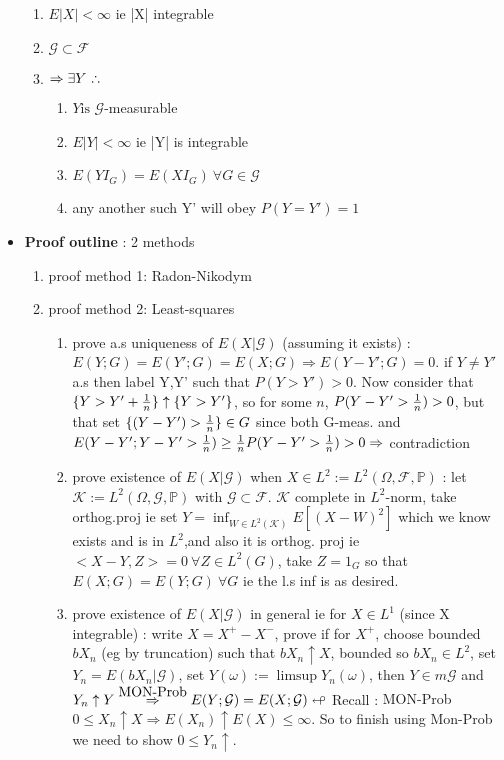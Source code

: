 \documentclass[10pt,landscape,a4paper]{article}
\newcommand\myright[1]{\stackrel{{\normalfont\mbox{#1}}}{ \Rightarrow }}
\begin{document}
\begin{multicols*}{3}
\begin{spacing}{0.5}
\begin{itemize}
\begin{enumerate}
\item $E|X| < \infty$ ie |X| integrable
\item $\mathcal{G} \subset \mathcal{F}$
\item $\Rightarrow \exists Y \sucht$
\begin{enumerate}
\item $Y \text{is } \mathcal{G}$-measurable
\item $E|Y| < \infty$ ie |Y| is integrable
\item $E(YI_G) = E(XI_G)\ \forall G \in \mathcal{G}$
\item any another such Y' will obey $P(Y=Y')=1$
\end{enumerate}
\end{enumerate}
\item \textbf{Proof outline} : 2 methods
\begin{enumerate}
\item proof method 1: Radon-Nikodym
\item proof method 2: Least-squares
\begin{enumerate}
\item prove a.s uniqueness of $E(X|\mathcal{G})$ (assuming it exists) : $E(Y;G)=E(Y';G)=E(X;G) \Rightarrow E(Y-Y';G)=0$. if $Y \neq Y'$ a.s then label Y,Y' such that $P(Y>Y')>0$. Now consider that $\{Y>Y'+ {1 \over n}\} \uparrow \{Y>Y'\}$, so for some $n$, $P(Y-Y'> {1\over n}) >0$, but that set $\{(Y-Y')> {1\over n}\} \in G$ since both G-meas. and $E(Y-Y';Y-Y'>{1 \over n})\ge {1 \over n} P(Y-Y' > {1 \over n}) >0 \Rightarrow$ contradiction

\item prove existence of $E(X|\mathcal{G})$ when $X \in L^2:=L^2(\Omega,\mathcal{F},\mathbb{P})$ : let $\mathcal{K}:=L^2(\Omega,\mathcal{G},\mathbb{P})$ with $\mathcal{G} \subset \mathcal{F}$. $\mathcal{K}$ complete in $L^2$-norm, take orthog.proj ie set $Y=\inf_{W \in L^2(\mathcal{K})} E [ {(X-W)}^2 ] $ which we know exists and is in $L^2$,and also it is orthog. proj ie $<X-Y,Z>=0\ \forall Z \in L^2(G)$, take $Z=1_G$ so that $E(X;G)=E(Y;G)\ \forall G$ ie the  l.s inf is as desired.

\item prove existence of $E(X|\mathcal{G})$ in general ie for $X \in L^1$ (since X integrable) : write $X=X^+-X^-$, prove if for $X^+$, choose bounded $bX_n$ (eg by truncation) such that $bX_n \uparrow X$, bounded so $bX_n \in L^2$, set $Y_n=E(bX_n|\mathcal{G})$, set $Y(\omega) := \limsup Y_n(\omega)$, then $Y \in m\mathcal{G}$ and $Y_n \uparrow Y \myright{MON-Prob} E(Y;\mathcal{G})=E(X;\mathcal{G}) \looparrowleft$ Recall :  \colorbox{green!10}{MON-Prob $  0 \le X_n \uparrow X \Rightarrow E(X_n) \uparrow E(X) \le \infty $}. So to finish using \colorbox{green!10}{Mon-Prob} we need to show $0 \le Y_n \uparrow$. 


\end{enumerate}
\end{enumerate}
\end{itemize}
\end{spacing}
\end{multicols*}
\end{document}
